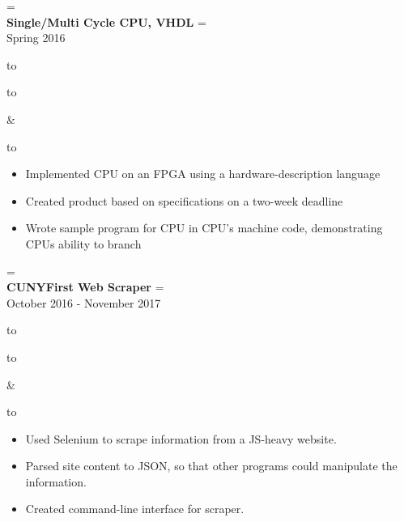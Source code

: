 \documentclass{article}
\newcommand{\appendtotoks}[2]{%
  #1=\expandafter{\the#1#2}%
}
\def\gobble#1{}
\def\gobblefirst#1{%
  #1\expandafter\expandafter\expandafter{\expandafter\gobble\the#1}}
\newcommand{\sectionTitle}[1]{{\Large #1} \vspace{4pt}}
\newenvironment{resumesection}[1]
  {\sectionTitle{#1}}
	{\vspace{10pt}}
\newcommand{\placeStyle}[1]{\textbf{#1}}
\newcommand{\positionStyle}[1]{\textit{#1}}
\newenvironment{newplace}
  {
    \newtoks\leftToks
    \newtoks\rightToks
    \newcommand{\placerow}[2]{%
      \appendtotoks{\leftToks}{\\\placeStyle{##1}}%
      \appendtotoks{\rightToks}{\\##2}}
    \newcommand{\jobrow}[2]{%
      \appendtotoks{\leftToks}{\\\positionStyle{##1}}%
      \appendtotoks{\rightToks}{\\##2}}
    \newcommand{\plainrow}[2]{%
      \appendtotoks{\leftToks}{\\##1}%
      \appendtotoks{\rightToks}{\\##2}}
    \setlength{\tabcolsep}{0pt}%
  }
  {%
    \begin{tabu} to \linewidth [h!]{X[65,l]X[35,r]}
      \begin{tabu} to \linewidth {X}
        \gobblefirst\leftToks
        \the\leftToks
      \end{tabu}
      &
      \begin{tabu} to \linewidth {X[r]}
        \gobblefirst\rightToks
        \the\rightToks
      \end{tabu}
    \end{tabu}%
  }
\newenvironment{bullets}
	{\begin{itemize}[noitemsep, topsep=0pt]}
	{\end{itemize}}
\begin{document}
\begin{resumesection}{Projects}
\begin{newplace}
  \placerow{Single/Multi Cycle CPU, VHDL}
           {Spring 2016}
\end{newplace}

\begin{bullets}
  \item Implemented CPU on an FPGA using a hardware-description
        language
  \item Created product based on specifications on a two-week
        deadline
  \item Wrote sample program for CPU in CPU's machine code,
        demonstrating CPUs ability to branch
\end{bullets}


\begin{newplace}
    \placerow{CUNYFirst Web Scraper}
             {October 2016 - November 2017}
\end{newplace}

\begin{bullets}
    \item Used Selenium to scrape information from a JS-heavy website.
    \item Parsed site content to JSON, so that other programs could
          manipulate the information.
    \item Created command-line interface for scraper.
\end{bullets}

\end{resumesection}
\end{document}

